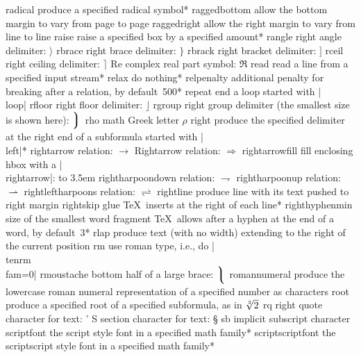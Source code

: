\capcs radical {produce a specified radical symbol}*{}
\capcs raggedbottom {allow the bottom margin to vary from page to page}{}{}
\capcs raggedright {allow the right margin to vary from line to line}{}{}
\capcs raise {raise a specified box by a specified amount}*{}
\capcs rangle {right angle delimiter: $\rangle$}{}{}
\capcs rbrace {right brace delimiter: $\rbrace$}{}{}
\capcs rbrack {right bracket delimiter: $\rbrack$}{}{}
\capcs rceil {right ceiling delimiter: $\rceil$}{}{}
\capcs Re {complex real part symbol: $\Re$}{}{}
\capcs read {read a line from a specified input stream}*{}
\capcs relax {do nothing}*{}
\capcs relpenalty {additional penalty for breaking after a relation,
   by default~500}*{}
\capcs repeat {end a loop started with |\\loop|}{}{\@repeat}
\capcs rfloor {right floor delimiter: $\rfloor$}{}{}
\capcs rgroup {right group delimiter (the smallest size is shown here):
   $\Big\rgroup$}{}{}
\capcs rho {math Greek letter $\rho$}{}{}
\capcs right {produce the specified delimiter at the right end of a
   subformula started with |\\left|}*{}
\capcs rightarrow {relation: $\rightarrow$}{}{}
\capcs Rightarrow {relation: $\Rightarrow$}{}{}
\capcs rightarrowfill {fill enclosing hbox with a |\\rightarrow|:
   \hbox to 3.5em{\rightarrowfill}}{}{}
\capcs rightharpoondown {relation: $\rightharpoondown$}{}{}
\capcs rightharpoonup {relation: $\rightharpoonup$}{}{}
\capcs rightleftharpoons {relation: $\rightleftharpoons$}{}{}
\capcs rightline {produce line with its text pushed to right margin}{}{}
\capcs rightskip {glue \TeX\ inserts at the right of each line}*{}
\capcs righthyphenmin {size of the smallest word fragment \TeX\ allows
   after a hyphen at the end of a word, by default~3}*{}
\capcs rlap {produce text (with no width) extending to the right
   of the current position}{}{}
\capcs rm {use roman type, i.e., do |\\tenrm\\fam=0|}{}{}
\capcs rmoustache {bottom half of a large brace: $\big\rmoustache$}{}{}
\capcs romannumeral {produce the lowercase roman numeral representation of a
   specified number as characters}{}{}
\capcs root {produce a specified root of a specified subformula, as in
   $\root 3 \of 2$}{}{}
\capcs rq {right quote character for text: \rq}{}{}
\capcs S {section character for text: \S}{}{}
\capcs sb {implicit subscript character}{}{}
\capcs scriptfont {the script style font in a specified math family}*{}
\capcs scriptscriptfont {the scriptscript style font in a specified 
   math family}*{}
